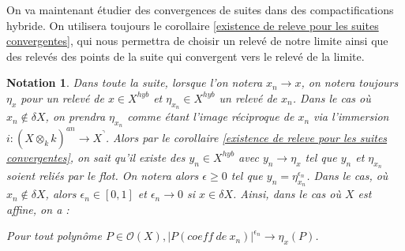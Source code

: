 \documentclass[11pt]{article}
\newtheorem{nota}[thm]{Notation}
\begin{document}






On va maintenant étudier des convergences de suites dans des compactifications hybride. On utilisera toujours le corollaire \ref{existence de releve pour les suites convergentes}, qui nous permettra de choisir un relevé de notre limite ainsi que des relevés des points de la suite qui convergent vers le relevé de la limite. 

\begin{nota}\label{On prend des releves de suite}
Dans toute la suite, lorsque l'on notera $x_n \rightarrow x$, on notera toujours $\eta_x$ pour un relevé de $x \in X^{hyb}$ et $\eta_{x_n} \in X^{hyb}$ un relevé de $x_n$. Dans le cas où $x_n \notin \delta X$, on prendra $\eta_{x_n}$ comme étant l'image réciproque de $x_n$ via l'immersion $i : (X \otimes_k \hat{k})^{an} \rightarrow X^\urcorner$. Alors par le corollaire \ref{existence de releve pour les suites convergentes}, on sait qu'il existe des $y_n \in X^{hyb}$ avec $y_n \rightarrow \eta_x$ tel que $y_n$ et $\eta_{x_n}$ soient reliés par le flot. On notera alors $\epsilon \geq 0$ tel que $y_n = \eta_{x_n}^{\epsilon_n}$. Dans le cas, où $x_n \notin \delta X$, alors $\epsilon_n \in [0,1]$ et $\epsilon_n \rightarrow 0$ si $x \in \delta X$.
Ainsi, dans le cas où $X$ est affine, on a :

Pour tout polynôme $P \in \mathcal{O}(X), |P(coeff~de~x_n)|^{\epsilon_n} \rightarrow \eta_x(P)$.
\end{nota}
\end{document}
